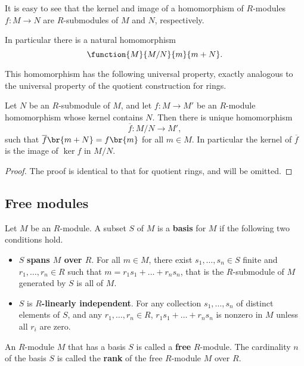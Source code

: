 It is easy to see that the kernel and image of a homomorphism of $ R $-modules $ f : M \to N $ are $ R $-submodules of $ M $ and $ N $, respectively.

\begin{note*}
In particular there is a natural homomorphism
$$ \function{M}{M / N}{m}{m + N}. $$
\end{note*}

This homomorphism has the following universal property, exactly analogous to the universal property of the quotient construction for rings.

\begin{proposition}
Let $ N $ be an $ R $-submodule of $ M $, and let $ f : M \to M' $ be an $ R $-module homomorphism whose kernel contains $ N $. Then there is unique homomorphism
$$ \overline{f} : M / N \to M', $$
such that $ \overline{f}\br{m + N} = f\br{m} $ for all $ m \in M $. In particular the kernel of $ \overline{f} $ is the image of $ \ker f $ in $ M / N $.
\end{proposition}

\begin{proof}
The proof is identical to that for quotient rings, and will be omitted.
\end{proof}

\subsection{Free modules}

\begin{definition}
Let $ M $ be an $ R $-module. A subset $ S $ of $ M $ is a \textbf{basis} for $ M $ if the following two conditions hold.
\begin{itemize}
\item $ S $ \textbf{spans $ M $ over $ R $}. For all $ m \in M $, there exist $ s_1, \dots, s_n \in S $ finite and $ r_1, \dots, r_n \in R $ such that $ m = r_1s_1 + \dots + r_ns_n $, that is the $ R $-submodule of $ M $ generated by $ S $ is all of $ M $.
\item $ S $ is \textbf{$ R $-linearly independent}. For any collection $ s_1, \dots, s_n $ of distinct elements of $ S $, and any $ r_1, \dots, r_n \in R $, $ r_1s_1 + \dots + r_ns_n $ is nonzero in $ M $ unless all $ r_i $ are zero.
\end{itemize}
\end{definition}

\begin{definition}
An $ R $-module $ M $ that has a basis $ S $ is called a \textbf{free} $ R $-module. The cardinality $ n $ of the basis $ S $ is called the \textbf{rank} of the free $ R $-module $ M $ over $ R $.
\end{definition}

